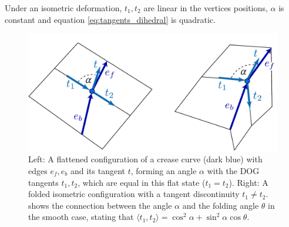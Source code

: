 Under an isometric deformation, $t_1,t_2$ are linear in the vertices positions, $\alpha$ is constant and equation \eqref{eq:tangents_dihedral} is quadratic.
\begin{figure} [h]
	\centering
	\includegraphics[width=0.8\linewidth]{figures/fold_angle_and_tangent_angles}
	\caption{Left: A flattened configuration of a crease curve (dark blue) with edges $e_f,e_b$ and its tangent $t$, forming an angle $\alpha$ with the DOG tangents $t_1,t_2$, which are equal in this flat state ($t_1=t_2$). Right: A folded isometric configuration with a tangent discontinuity  $t_1 \neq t_2$.  shows the connection between the angle $\alpha$ and the folding angle $\theta$ in the smooth case, stating that $\langle t_1, t_2 \rangle = \cos^2\!\alpha + \sin^2\!\alpha \cos\theta$. }
	\label{fig:fold_angle_and_tangent_angles}
\end{figure}

